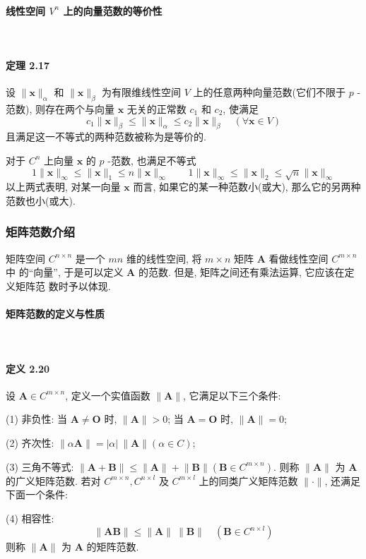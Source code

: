 \paragraph[]{线性空间 $V^n$ 上的向量范数的等价性} \

\paragraph*{定理 2.17} 设 $\lVert \bm{x} \rVert _\alpha$ 和 $\lVert \bm{x} \rVert _\beta$ 为有限维线性空间 $V$ 上的任意两种向量范数(它们不限于 $p$ -范数), 则存在两个与向量 $\bm{x}$ 无关的正常数 $c_1$ 和 $c_2$, 使满足
$$
    c_1 \lVert \bm{x} \rVert _\beta \leqslant \lVert \bm{x} \rVert _\alpha \leqslant c_2 \lVert \bm{x} \rVert _\beta \quad (\forall \bm{x} \in V)
$$
且满足这一不等式的两种范数被称为是等价的.

\par 对于 $C^n$ 上向量 $\bm{x}$ 的 $p$ -范数, 也满足不等式
$$
    1 \lVert \bm{x} \rVert _\infty \leqslant \lVert \bm{x} \rVert _1 \leqslant n \lVert \bm{x} \rVert _\infty \qquad
    1 \lVert \bm{x} \rVert _\infty \leqslant \lVert \bm{x} \rVert _2 \leqslant \sqrt{n} \lVert \bm{x} \rVert _\infty
$$
以上两式表明, 对某一向量 $\bm{x}$ 而言, 如果它的某一种范数小(或大), 那么它的另两种范数也小(或大).

\subsubsection{矩阵范数介绍}

矩阵空间 $C^{n\times n}$ 是一个 $mn$ 维的线性空间, 将 $m\times n$ 矩阵 $\bm{A}$ 看做线性空间 $C^{m\times n}$ 中
的“向量”, 于是可以定义 $\bm{A}$ 的范数. 但是, 矩阵之间还有乘法运算, 它应该在定义矩阵范
数时予以体现.

\paragraph[]{矩阵范数的定义与性质} \

\paragraph*{定义 2.20} 设 $\bm{A} \in C^{m\times n}$, 定义一个实值函数 $\lVert \bm{A} \rVert$, 它满足以下三个条件:
\par (1) 非负性: 当 $\bm{A} \neq \bm{O}$ 时, $\lVert \bm{A} \rVert > 0$; 当 $\bm{A} = \bm{O}$ 时, $\lVert \bm{A} \rVert = 0$;
\par (2) 齐次性: $\lVert \alpha\bm{A} \rVert = \lvert \alpha \rvert \ \lVert \bm{A} \rVert (\alpha \in C)$;
\par (3) 三角不等式: $\lVert \bm{A} + \bm{B} \rVert \leqslant \lVert \bm{A} \rVert + \lVert \bm{B} \rVert (\bm{B} \in C^{m \times n})$.
则称 $\lVert \bm{A} \rVert$ 为 $\bm{A}$ 的广义矩阵范数. 若对 $C^{m\times n}, C^{n\times l}$ 及 $C^{m\times l}$ 上的同类广义矩阵范数 $\lVert \bm{\cdot} \rVert$, 还满足下面一个条件:
\par (4) 相容性:
$$
    \lVert \bm{AB} \rVert \leqslant \lVert \bm{A} \rVert \ \lVert \bm{B} \rVert \quad (\bm{B} \in C^{n\times l})
$$
则称 $\lVert \bm{A} \rVert$ 为 $\bm{A}$ 的矩阵范数.


